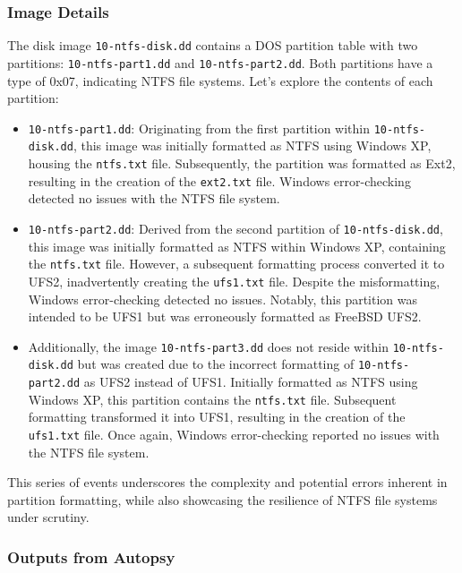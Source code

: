 \documentclass{extarticle}
\begin{document}
\subsubsection*{Image Details}

The disk image \texttt{10-ntfs-disk.dd} contains a DOS partition table with two partitions: \texttt{10-ntfs-part1.dd} and \texttt{10-ntfs-part2.dd}. Both partitions have a type of 0x07, indicating NTFS file systems. Let's explore the contents of each partition:

\begin{itemize}
    \item \texttt{10-ntfs-part1.dd}: Originating from the first partition within \texttt{10-ntfs-disk.dd}, this image was initially formatted as NTFS using Windows XP, housing the \texttt{ntfs.txt} file. Subsequently, the partition was formatted as Ext2, resulting in the creation of the \texttt{ext2.txt} file. Windows error-checking detected no issues with the NTFS file system.
    
    \item \texttt{10-ntfs-part2.dd}: Derived from the second partition of \texttt{10-ntfs-disk.dd}, this image was initially formatted as NTFS within Windows XP, containing the \texttt{ntfs.txt} file. However, a subsequent formatting process converted it to UFS2, inadvertently creating the \texttt{ufs1.txt} file. Despite the misformatting, Windows error-checking detected no issues. Notably, this partition was intended to be UFS1 but was erroneously formatted as FreeBSD UFS2.
    
    \item Additionally, the image \texttt{10-ntfs-part3.dd} does not reside within \texttt{10-ntfs-disk.dd} but was created due to the incorrect formatting of \texttt{10-ntfs-part2.dd} as UFS2 instead of UFS1. Initially formatted as NTFS using Windows XP, this partition contains the \texttt{ntfs.txt} file. Subsequent formatting transformed it into UFS1, resulting in the creation of the \texttt{ufs1.txt} file. Once again, Windows error-checking reported no issues with the NTFS file system.
\end{itemize}

This series of events underscores the complexity and potential errors inherent in partition formatting, while also showcasing the resilience of NTFS file systems under scrutiny.

\subsubsection*{Outputs from Autopsy}
\end{document}

